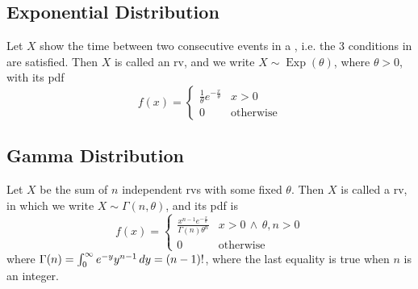 \documentclass[notoc,notitlepage]{tufte-book}
\DeclareMathOperator{\Exp}{Exp }
\begin{document}

\subsection{Exponential Distribution}
\label{sub:exponential_distribution}

\begin{defn}[Exponential RV]\label{defn:exponential_rv}
  Let $X$ show the time between two consecutive events in a , i.e. the 3 conditions in  are satisfied. Then $X$ is called an  rv, and we write $X \sim \Exp(\theta)$, where $\theta > 0$, with its pdf
  \begin{equation*}
    f(x) = \begin{cases} 
      \frac{1}{\theta} e^{- \frac{x}{\theta}} & x > 0 \\
      0                                       & \text{otherwise}
    \end{cases}
  \end{equation*}
\end{defn}


\subsection{Gamma Distribution}
\label{sub:gamma_distribution}

\begin{defn}[Gamma RV]\label{defn:gamma_rv}
  Let $X$ be the sum of $n$ independent  rvs with some fixed $\theta$. Then $X$ is called a  rv, in which we write $X \sim \Gamma(n, \theta)$, and its pdf is
  \begin{equation*}
    f(x) = \begin{cases} 
      \frac{x^{n - 1} e^{- \frac{x}{\theta}}}{\Gamma(n) \theta^n} & x > 0 \, \land \, \theta, n > 0 \\
      0                                                           & \text{otherwise}
    \end{cases}
  \end{equation*}
  where $\Gamma(n) = \int_{0}^{\infty} e^{-y} y^{n - 1} \mathop{}\!d{y} = (n - 1)!$, where the last equality is true when $n$ is an integer.
\end{defn}
\end{document}
